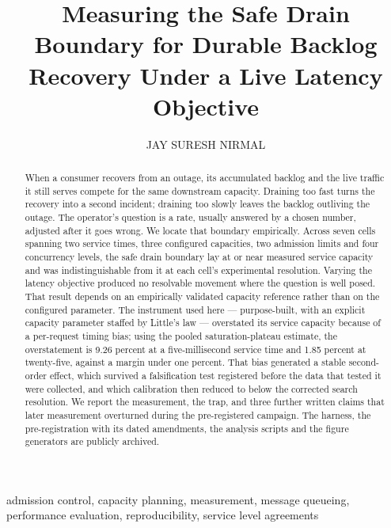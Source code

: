 \documentclass{ieeeaccess}
\begin{document}
\title{Measuring the Safe Drain Boundary for Durable Backlog Recovery Under a Live Latency Objective}
\author{\uppercase{Jay Suresh Nirmal}}
\address[1]{Independent Researcher, Boston, MA, USA (e-mail: jaynirmal15@gmail.com; ORCID: 0009-0003-0886-4663)}

\begin{abstract}
When a consumer recovers from an outage, its accumulated backlog and the live traffic it still serves compete for the same downstream capacity. Draining too fast turns the recovery into a second incident; draining too slowly leaves the backlog outliving the outage. The operator's question is a rate, usually answered by a chosen number, adjusted after it goes wrong. We locate that boundary empirically. Across seven cells spanning two service times, three configured capacities, two admission limits and four concurrency levels, the safe drain boundary lay at or near measured service capacity and was indistinguishable from it at each cell's experimental resolution. Varying the latency objective produced no resolvable movement where the question is well posed. That result depends on an empirically validated capacity reference rather than on the configured parameter. The instrument used here --- purpose-built, with an explicit capacity parameter staffed by Little's law --- overstated its service capacity because of a per-request timing bias; using the pooled saturation-plateau estimate, the overstatement is 9.26 percent at a five-millisecond service time and 1.85 percent at twenty-five, against a margin under one percent. That bias generated a stable second-order effect, which survived a falsification test registered before the data that tested it were collected, and which calibration then reduced to below the corrected search resolution. We report the measurement, the trap, and three further written claims that later measurement overturned during the pre-registered campaign. The harness, the pre-registration with its dated amendments, the analysis scripts and the figure generators are publicly archived.
\end{abstract}

\begin{IEEEkeywords}
admission control, capacity planning, measurement, message queueing, performance evaluation, reproducibility, service level agreements
\end{IEEEkeywords}
\end{document}

